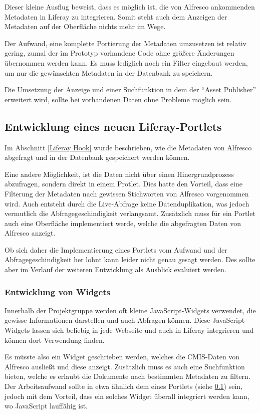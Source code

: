 Dieser kleine Ausflug beweist, dass es m\"oglich ist, die von Alfresco ankommenden Metadaten in Liferay zu integrieren. Somit steht auch dem Anzeigen der Metadaten auf der Oberfl\"ache nichts mehr im Wege. \cite{Chemistry_examples}

Der Aufwand, eine komplette Portierung der Metadaten umzusetzen ist relativ gering, zumal der im Prototyp vorhandene Code ohne gr\"o\ss{}ere \"Anderungen \"ubernommen werden kann. Es muss lediglich noch ein Filter eingebaut werden, um nur die gew\"unschten Metadaten in der Datenbank zu speichern.

Die Umsetzung der Anzeige und einer Suchfunktion in dem der "`Asset Publisher"' erweitert wird, sollte bei vorhandenen Daten ohne Probleme m\"oglich sein.

\subsection{Entwicklung eines neuen Liferay-Portlets}\label{Liferay Portlet}
Im Abschnitt \ref{Liferay Hook} wurde beschrieben, wie die Metadaten von Alfresco abgefragt und in der Datenbank gespeichert werden k\"onnen.

Eine andere  M\"oglichkeit, ist die Daten nicht \"uber einen Hinergrundprozess abzufragen, sondern direkt in einem Protlet. Dies hatte den Vorteil, dass eine Filterung der Metadaten nach gewissen Stichworten von Alfresco vorgenommen wird. Auch entsteht durch die Live-Abfrage keine Datenduplikation, was jedoch vermutlich die Abfragegeschindigkeit verlangsamt.
Zus\"atzlich muss f\"ur ein Portlet auch eine Oberfl\"ache implementiert werde, welche die abgefragten Daten von Alfresco anzeigt.

Ob sich daher die Implementierung eines Portlets vom Aufwand und der Abfragegeschindigkeit her lohnt kann leider nicht genau gesagt werden. Des sollte aber im Verlauf der weiteren Entwicklung als Ausblick evaluiert werden.

\subsubsection{Entwicklung von Widgets}\label{Liferay Widget}
Innerhalb der Projektgruppe werden oft kleine JavaScript-Widgets verwendet, die gewisse Informationen darstellen und auch Abfragen k\"onnen. 
Diese JavaScript-Widgets lassen sich beliebig in jede Webseite und auch in Liferay integrieren und k\"onnen dort Verwendung finden.

Es m\"usste also ein Widget geschrieben werden, welches die \ac{CMIS}-Daten von Alfresco auslie\ss{}t und diese anzeigt. Zus\"atzlich muss es auch eine Suchfunktion bieten, welche es erlaubt die Dokumente nach bestimmten Metadaten zu filtern. Der Arbeitsaufwand sollte in etwa \"ahnlich dem eines Portlets (siehe \ref{Liferay Portlet}) sein, jedoch mit dem Vorteil, dass ein solches Widget \"uberall integriert werden kann, wo JavaScript lauff\"ahig ist. 

